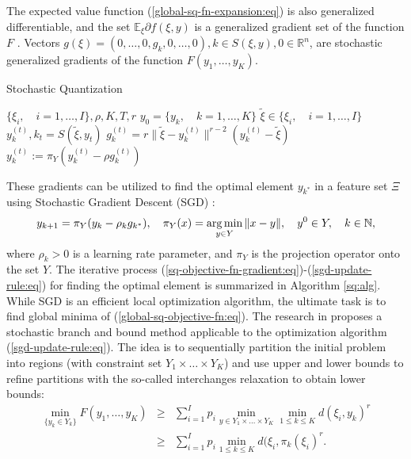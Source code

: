 The expected value function (\ref{global-sq-fn-expansion:eq}) is also generalized differentiable, and the set $\mathbb{E}_{\xi} \partial f(\xi, y)$ is a generalized gradient set of the function $F$ \cite{mikhalevich2024,Norkin_1986}. Vectors $g(\xi) = (0, \ldots, 0, g_k, 0, \ldots, 0), k \in S(\xi, y), 0 \in \mathbb{R}^n$, are stochastic generalized gradients of the function $F(y_1, \ldots, y_K)$.
\begin{algorithm}
    \caption{Stochastic Quantization}\label{sq:alg}
    \begin{algorithmic}[1]
    \Require $ \{ \xi_i, \quad i = 1, \ldots, I \}, \rho, K, T, r $
    \State $ y_0 = \{ y_k, \quad k = 1, \ldots, K \} $ 
        \State $ \tilde{\xi} \in \{ \xi_i, \quad i = 1, \ldots, I \} $ 
        \State $ y_k^{(t)}, k_t = S(\tilde{\xi}, y_t) $ 
        \State $ g_k^{(t)} = r \| \tilde{\xi} - y_k^{(t)} \|^{r - 2} (y_k^{(t)} - \tilde{\xi}) $ 
        \State $ y_k^{(t)} := \pi_Y (y_k^{(t)} - \rho g_k^{(t)}) $ 
    \EndFor
    \end{algorithmic}
\end{algorithm}

These gradients can be utilized to find the optimal element $y_{k^*}$ in a feature set $\Xi$ using Stochastic Gradient Descent (SGD) \cite{ermoliev1976stochastic,kiefer1952stochastic,Norkin_Kozyriev_Norkin_2024,Robbins_Monro_1951}:
\begin{equation}
    \label{sgd-update-rule:eq}
        y_{k+1} = \pi_Y (y_k - \rho_k g_{k^*}), \quad \pi_Y (x) = \operatorname*{arg\,min}_{y \in Y} \| x - y\|, \quad y^0 \in Y, \quad k \in \mathbb{N},
\end{equation}
\noindent where $\rho_k > 0$ is a learning rate parameter, and $\pi_Y$ is the projection operator onto the set $Y$. The iterative process (\ref{sq-objective-fn-gradient:eq})-(\ref{sgd-update-rule:eq}) for finding the optimal element is summarized in Algorithm \ref{sq:alg}. While SGD is an efficient local optimization algorithm, the ultimate task is to find global minima of (\ref{global-sq-objective-fn:eq}). The research in \cite{Norkin_Pflug_Ruszczynski_1998} proposes a stochastic branch and bound method applicable to the optimization algorithm (\ref{sgd-update-rule:eq}). The idea is to sequentially partition the initial problem into regions (with constraint set $Y_1 \times \ldots \times Y_K$) and use upper and lower bounds to refine partitions with the so-called interchanges relaxation to obtain lower bounds:
\begin{eqnarray}
    \label{sq-branch-bound:eq}
				\min_{\{ y_k \in Y_k \}} F(y_1, \ldots, y_K)
        &\geq& \sum_{i=1}^I p_i \min_{y \in Y_1\times\ldots\times Y_K} \min_{1 \leq k \leq K} d(\xi_i, y_k)^r \nonumber\\
				&\geq& \sum_{i=1}^I p_i \min_{1 \leq k \leq K} d(\xi_i, \pi_k(\xi_i)^r. 
\end{eqnarray}

